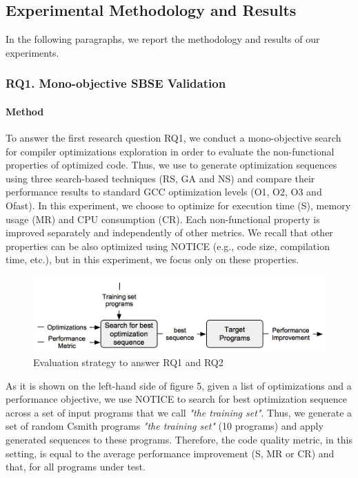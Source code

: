 \subsection{Experimental Methodology and Results}
In the following paragraphs, we report the methodology and results of our experiments.

\subsubsection{RQ1. Mono-objective SBSE Validation}
\paragraph{Method}

To answer the first research question RQ1, we conduct a mono-objective search for compiler optimizations exploration in order to evaluate the non-functional properties of optimized code. Thus, we use to generate optimization sequences using three search-based techniques (RS, GA and NS) and compare their performance results to standard GCC optimization levels (O1, O2, O3 and Ofast). 
In this experiment, we choose to optimize for execution time (S), memory usage (MR) and CPU consumption (CR). Each non-functional property is improved separately and independently of other metrics. We recall that other properties can be also optimized using NOTICE (e.g., code size, compilation time, etc.), but in this experiment, we focus only on these properties.

\begin{figure}[h]
	\centering
	\includegraphics[width=1.\linewidth]{Ressources/sensitivity.png}
	\caption{Evaluation strategy to answer RQ1 and RQ2}
\end{figure}
As it is shown on the left-hand side of figure 5, given a list of optimizations and a performance objective, we use NOTICE to search for best optimization sequence across a set of input programs that we call \textit{"the training set"}. Thus, we generate a set of random Csmith programs \textit{"the training set"} (10 programs) and apply generated sequences to these programs. Therefore, the code quality metric, in this setting, is equal to the average performance improvement (S, MR or CR) and that, for all programs under test. 

